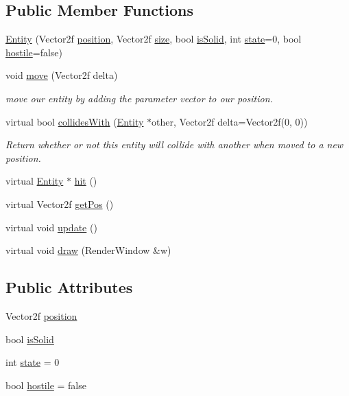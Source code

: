 \subsection*{Public Member Functions}
\begin{DoxyCompactItemize}
\item 
\hyperlink{class_entity_a80b784625d59ece058c02726450127de}{Entity} (Vector2f \hyperlink{class_entity_a6af9d6498134ad0906011778bc5736db}{position}, Vector2f \hyperlink{class_entity_ae9a0a364c85f91ade5088b3610131417}{size}, bool \hyperlink{class_entity_af1b0754c9d5f4afa73834b23c6437101}{is\+Solid}, int \hyperlink{class_entity_a4edd9cc2506add0d9e27fade0bf957e8}{state}=0, bool \hyperlink{class_entity_a22234c0796f8c2ca0d116495c83ecdd6}{hostile}=false)
\item 
void \hyperlink{class_entity_a1d077cd5a6aa78265e4d9888cfc39d2c}{move} (Vector2f delta)
\begin{DoxyCompactList}\small\item\em move our entity by adding the parameter vector to our position. \end{DoxyCompactList}\item 
virtual bool \hyperlink{class_entity_af8678a1582e2a478d66df1ff29b66a0d}{collides\+With} (\hyperlink{class_entity}{Entity} $\ast$other, Vector2f delta=Vector2f(0, 0))
\begin{DoxyCompactList}\small\item\em Return whether or not this entity will collide with another when moved to a new position. \end{DoxyCompactList}\item 
virtual \hyperlink{class_entity}{Entity} $\ast$ \hyperlink{class_entity_a29117f3f40e7069d5d4c1b2fca7819d6}{hit} ()
\item 
virtual Vector2f \hyperlink{class_entity_a8b6080f0ab76702fcd00108aef8ea9dd}{get\+Pos} ()
\item 
virtual void \hyperlink{class_entity_aed73e98b980b85833428c935cc1c69f8}{update} ()
\item 
virtual void \hyperlink{class_entity_a030c3aa6641df7981a2d8a3fba890ec7}{draw} (Render\+Window \&w)
\end{DoxyCompactItemize}
\subsection*{Public Attributes}
\begin{DoxyCompactItemize}
\item 
Vector2f \hyperlink{class_entity_a6af9d6498134ad0906011778bc5736db}{position}
\item 
bool \hyperlink{class_entity_af1b0754c9d5f4afa73834b23c6437101}{is\+Solid}
\item 
int \hyperlink{class_entity_a4edd9cc2506add0d9e27fade0bf957e8}{state} = 0
\item 
bool \hyperlink{class_entity_a22234c0796f8c2ca0d116495c83ecdd6}{hostile} = false
\end{DoxyCompactItemize}
